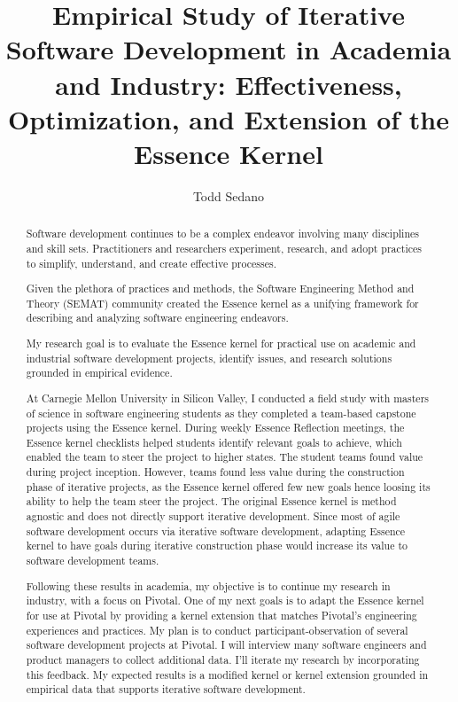 \documentclass[preprint,12pt,3p]{elsarticle}
\begin{document}
\begin{frontmatter}

\title{Empirical Study of Iterative Software Development in Academia and Industry: Effectiveness, Optimization, and Extension of the Essence Kernel}

\author{Todd Sedano}


\address{Carnegie Mellon University}
\address{Silicon Valley Campus}
\address{Moffett Field, CA 94035, USA}


\begin{abstract}
Software development continues to be a complex endeavor involving many disciplines and skill sets. Practitioners and researchers experiment, research, and adopt practices to simplify, understand, and create effective processes. 

Given the plethora of practices and methods, the Software Engineering Method and Theory (SEMAT) community created the Essence kernel as a unifying framework for describing and analyzing software engineering endeavors. 

My research goal is to evaluate the Essence kernel for practical use on academic and industrial software development projects, identify issues, and research solutions grounded in empirical evidence. 

At Carnegie Mellon University in Silicon Valley, I conducted a field study with masters of science in software engineering students as they completed a team-based capstone projects using the Essence kernel. During weekly Essence Reflection meetings, the Essence kernel checklists helped students identify relevant goals to achieve, which enabled the team to steer the project to higher states. The student teams found value during project inception. However, teams found less value during the construction phase of iterative projects, as the Essence kernel offered few new goals hence loosing its ability to help the team steer the project. The original Essence kernel is method agnostic and does not directly support iterative development. Since most of agile software development occurs via iterative software development, adapting Essence kernel to have goals during iterative construction phase would increase its value to software development teams.

Following these results in academia, my objective is to continue my research in industry, with a focus on Pivotal. One of my next goals is to adapt the Essence kernel for use at Pivotal by providing a kernel extension that matches Pivotal's engineering experiences and practices. My plan is to conduct participant-observation of several software development projects at Pivotal. I will interview many software engineers and product managers to collect additional data. I'll iterate my research by incorporating this feedback. My expected results is a modified kernel or kernel extension grounded in empirical data that supports iterative software development. 


\end{abstract}
\end{frontmatter}
\end{document}
